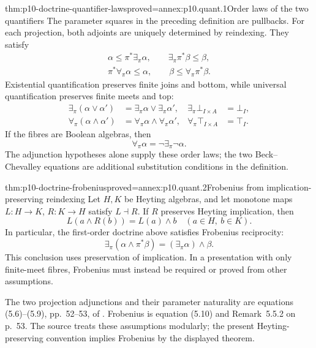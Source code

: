 \begin{hbtheorem}{thm:p10-doctrine-quantifier-laws}{proved=annex:p10.quant.1}{Order laws of the two quantifiers}
The parameter squares in the preceding definition are pullbacks.
For each projection, both adjoints are uniquely determined by
reindexing.  They satisfy
\[
 \begin{gathered}
 \alpha\leq\pi^*\exists_\pi\alpha,\qquad
 \exists_\pi\pi^*\beta\leq\beta,\\
 \pi^*\forall_\pi\alpha\leq\alpha,\qquad
 \beta\leq\forall_\pi\pi^*\beta .
 \end{gathered}
\]
Existential quantification preserves finite joins and bottom,
while universal quantification preserves finite meets and top:
\[
 \begin{aligned}
 \exists_\pi(\alpha\vee\alpha')
       &=\exists_\pi\alpha\vee\exists_\pi\alpha',
 &\exists_\pi\bot_{I\times A}&=\bot_I,\\
 \forall_\pi(\alpha\wedge\alpha')
       &=\forall_\pi\alpha\wedge\forall_\pi\alpha',
 &\forall_\pi\top_{I\times A}&=\top_I.
 \end{aligned}
\]
If the fibres are Boolean algebras, then
\[
                   \forall_\pi\alpha
                         =\neg\exists_\pi\neg\alpha .
\]
The adjunction hypotheses alone supply these order laws;
the two Beck--Chevalley equations are additional substitution
conditions in the definition.
\end{hbtheorem}

\begin{hbtheorem}{thm:p10-doctrine-frobenius}{proved=annex:p10.quant.2}{Frobenius from implication-preserving reindexing}
Let \(H,K\) be Heyting algebras, and let monotone maps
\(L:H\to K\), \(R:K\to H\) satisfy \(L\dashv R\).
If \(R\) preserves Heyting implication, then
\[
                         L(a\wedge R(b))=L(a)\wedge b
                         \quad(a\in H,\ b\in K).
\]
In particular, the first-order doctrine above satisfies
Frobenius reciprocity:
\[
             \exists_\pi(\alpha\wedge\pi^*\beta)
                    =(\exists_\pi\alpha)\wedge\beta.
\]
This conclusion uses preservation of implication.
In a presentation with only finite-meet fibres, Frobenius
must instead be required or proved from other assumptions.
\end{hbtheorem}

The two projection adjunctions and their parameter naturality are
equations (5.6)--(5.9), pp.~52--53, of
\cite{Pitts1995Draft}.  Frobenius is equation (5.10) and
Remark~5.5.2 on p.~53.  The source treats these assumptions
modularly; the present Heyting-preserving convention implies
Frobenius by the displayed theorem.

